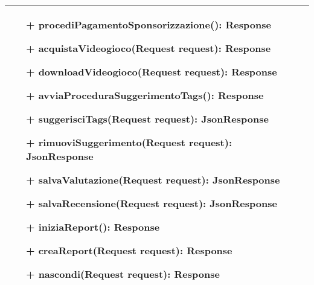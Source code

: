 \begin{tabular}{|| l | p{28em} ||}
\begin{itemize}
		\item[+] procediPagamentoSponsorizzazione(): Response
		\item[+] acquistaVideogioco(Request request): Response
		\item[+] downloadVideogioco(Request request): Response
		\item[+] avviaProceduraSuggerimentoTags(): Response
		\item[+] suggerisciTags(Request request): JsonResponse
		\item[+] rimuoviSuggerimento(Request request): JsonResponse
		\item[+] salvaValutazione(Request request): JsonResponse
		\item[+] salvaRecensione(Request request): JsonResponse
		\item[+] iniziaReport(): Response
		\item[+] creaReport(Request request): Response
		\item[+] nascondi(Request request): Response
	\end{itemize}\\
	\hline
\end{tabular}

\newpage
